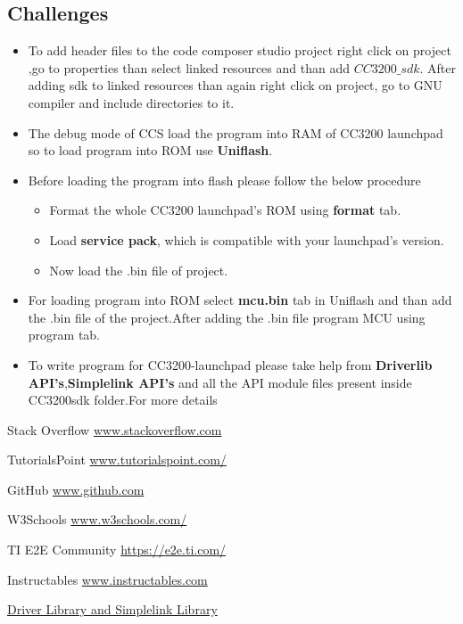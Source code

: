 \documentclass[a4paper,12pt,oneside]{book}
\begin{document}
\subsection*{Challenges}
\begin{itemize}
	\item To add header files to the code composer studio project right click on project ,go to properties than select linked resources and than add $CC3200\_sdk$. After adding sdk to linked resources than again right click on project, go to GNU compiler and include directories to it.
	\item The debug mode of CCS load the program into RAM of CC3200 launchpad so to load program into ROM use \textbf{Uniflash}.
	\item Before loading the program into flash please follow the below procedure
	\begin{itemize}
		\item Format the whole CC3200 launchpad's ROM using \textbf{format} tab.
		\item Load \textbf{service pack}, which is compatible with your launchpad's version.
		\item Now load the .bin file of project. 
	\end{itemize} 
	\item For loading program into ROM select \textbf{mcu.bin} tab in Uniflash and than add the .bin file of the project.After adding the .bin file program MCU using program tab.
	\item To write program for CC3200-launchpad please take help from \textbf{Driverlib API's},\textbf{Simplelink API's} and all the API module files present inside CC3200sdk folder.For more details 
	   
\end{itemize}

\begin{thebibliography}{li}
		\item{Stack Overflow  \href{www.stackoverflow.com}{www.stackoverflow.com}}
		\item{TutorialsPoint  \href{tutorialspoint.com/}{www.tutorialspoint.com/}}
		\item{GitHub  \href{github.com}{www.github.com}}
		\item{W3Schools  \href{http://www.w3schools.com/}{www.w3schools.com/}}
		\item{TI E2E Community \href{TI E2E Community}{	https://e2e.ti.com/}}
		\item{Instructables \href{www.Instructables .com}{www.instructables.com}}
		\item\href{https://github.com/eYSIP-2016/eYSIP2016-GHPowerMonitoring/tree/master/Documents}{Driver Library and Simplelink Library}{\label{50}}
		
\end{thebibliography}
\end{document}
